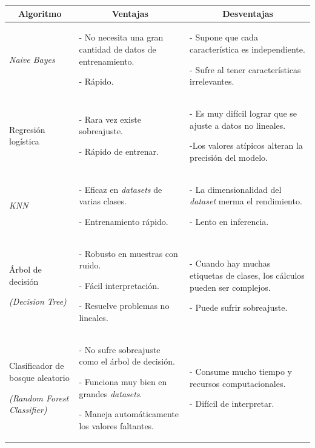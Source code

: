 \documentclass[a4paper,12pt]{article}
\begin{document}
\begin{landscape}
		
	\begin{table}[]
		\centering
		\begin{tabularx}{\hsize}{|X|X|X|}
			\hline
			\multicolumn{1}{|c|}{\textbf{Algoritmo}} & \multicolumn{1}{|c|}{\textbf{Ventajas}} & \multicolumn{1}{|c|}{\textbf{Desventajas}} \\
			\hline
			\textit{Naive Bayes}   & 
			- No necesita una gran cantidad de datos de entrenamiento. 
						
			- Rápido. & 
			- Supone que cada característica es independiente. 
						
			- Sufre al tener características irrelevantes.
			\\ \hline
			Regresión logística      & 
			- Rara vez existe sobreajuste. 
						
			- Rápido de entrenar. & 
			- Es muy difícil lograr que se ajuste a datos no lineales. 
						
			-Los valores atípicos alteran la precisión del modelo. 
						
			\\ \hline
			\textit{KNN}           & 
			- Eficaz en \textit{datasets} de varias clases. 
						
			- Entrenamiento rápido. & 
			- La dimensionalidad del \textit{dataset} merma el rendimiento.
						
			- Lento en inferencia. 
			\\ \hline
			Árbol de decisión 
						
			\textit{(Decision Tree)} & 
			- Robusto en muestras con ruido. 
						
			- Fácil interpretación. 
						
			- Resuelve problemas no lineales. & 
			- Cuando hay muchas etiquetas de clases, los cálculos pueden ser complejos. 
						
			- Puede sufrir sobreajuste. 
			\\ \hline
			Clasificador de bosque aleatorio 
						
			\textit{(Random Forest Classifier)} & 
			- No sufre sobreajuste como el árbol de decisión. 
						
			- Funciona muy bien en grandes \textit{datasets}. 
						
			- Maneja automáticamente los valores faltantes. & 
			- Consume mucho tiempo y recursos computacionales.
						
			- Difícil de interpretar.
						

\end{tabularx}
\end{table}
\end{landscape}
\end{document}
